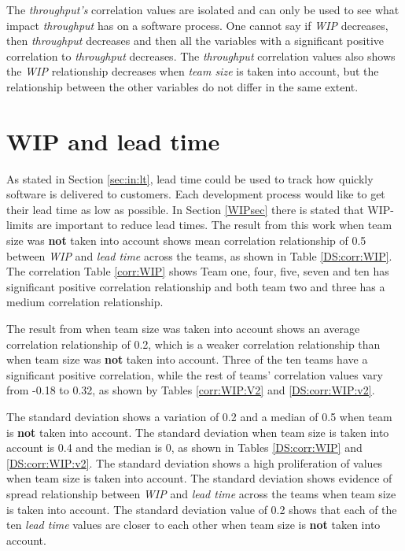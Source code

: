 \documentclass[UKenglish]{ifimaster}  %
\begin{document}
The \textit{throughput's} correlation values are isolated and can only be used to see what impact \textit{throughput} has on a software process. One cannot say if \textit{WIP} decreases, then \textit{throughput} decreases and then all the variables with a significant positive correlation to \textit{throughput} decreases. The \textit{throughput} correlation values also shows the \textit{WIP} relationship decreases when \textit{team size} is taken into account, but the relationship between the other variables do not differ in the same extent.




\section{WIP and lead time}
\vspace{-1em}
As stated in Section \ref{sec:in:lt}, lead time could be used to track how quickly software is delivered to customers. Each development process would like to get their lead time as low as possible. In Section \ref{WIPsec} there is stated that WIP-limits are important to reduce lead times. The result from this work when team size was \textbf{not} taken into account shows mean correlation relationship of 0.5 between \textit{WIP} and \textit{lead time} across the teams,  as shown in Table \ref{DS:corr:WIP}.  The correlation Table \ref{corr:WIP} shows Team one, four, five, seven and ten has significant positive correlation relationship and both team two and three has a medium correlation relationship.

The result from when team size was taken into account shows an average correlation relationship of 0.2, which is a weaker correlation relationship than when team size was \textbf{not} taken into account. Three of the ten teams have a significant positive correlation, while the rest of teams' correlation values vary from -0.18 to 0.32, as shown by Tables \ref{corr:WIP:V2} and \ref{DS:corr:WIP:v2}. 

The standard deviation shows a variation of 0.2 and a median of 0.5 when team is \textbf{not} taken into account. The standard deviation when team size is taken into account is 0.4 and the median is 0, as shown in Tables  \ref{DS:corr:WIP} and \ref{DS:corr:WIP:v2}. The standard deviation shows a high proliferation of values when team size is taken into account. The standard deviation shows evidence of spread relationship between \textit{WIP} and \textit{lead time} across the teams  when team size is taken into account.   The standard deviation value of 0.2 shows that  each of the ten \textit{lead time} values are closer to each other when team size is \textbf{not} taken into account.  
\end{document}
